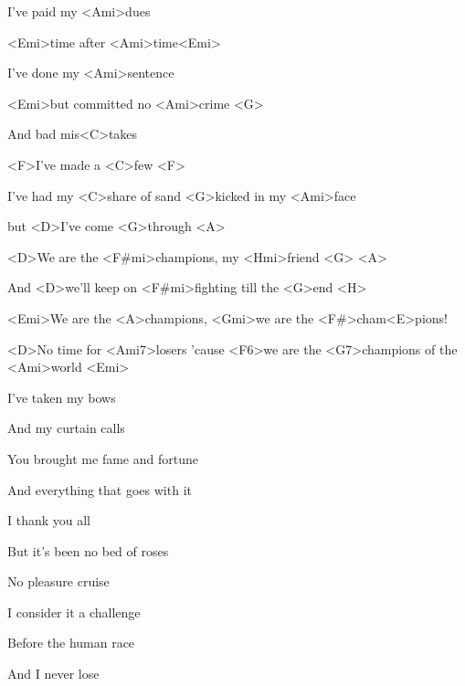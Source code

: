 

\zs
I've paid my <Ami>dues

<Emi>time after <Ami>time<Emi>

I've done my <Ami>sentence

<Emi>but committed no <Ami>crime <G>

And bad mis<C>takes

<F>I've made a <C>few <F>

I've had my <C>share of sand <G>kicked in my <Ami>face

but <D>I've come <G>through <A>
\ks

\zr
<D>We are the <F#mi>champions, my <Hmi>friend <G> <A>

And <D>we'll keep on <F#mi>fighting till the <G>end <H>

<Emi>We are the <A>champions, <Gmi>we are the <F#>cham<E>pions!

<D>No time for <Ami7>losers 'cause <F6>we are the <G7>champions of the <Ami>world <Emi>
\kr

\zs
I've taken my bows

And my curtain calls

You brought me fame and fortune

And everything that goes with it

I thank you all

But it's been no bed of roses

No pleasure cruise

I consider it a challenge

Before the human race

And I never lose
\ks

\zr \kr

\kp

